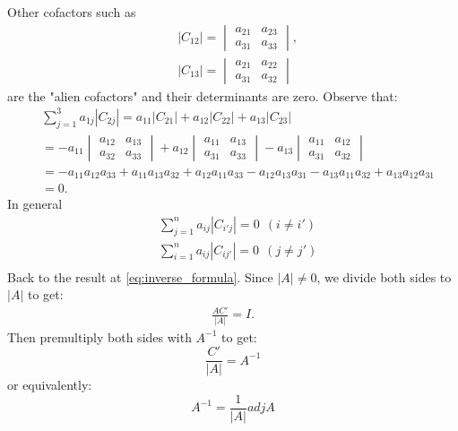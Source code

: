\documentclass[10pt,a4paper]{book}
\theoremstyle{definition}\newtheorem{definition}{Definition}
\theoremstyle{definition}\newtheorem{fact}{Fact}
\theoremstyle{definition}\newtheorem{ex}{Ex.}
\theoremstyle{definition}\newtheorem{project}{Project}
\theoremstyle{definition}\newtheorem{problem}{Problem}
\theoremstyle{definition}\newtheorem{example}{Example}
\numberwithin{theorem}{chapter}
\numberwithin{corollary}{chapter}
\numberwithin{assumption}{chapter}
\numberwithin{definition}{chapter}
\numberwithin{prop}{chapter}
\numberwithin{notation}{chapter}
\numberwithin{problem}{chapter}
\numberwithin{example}{chapter}
\numberwithin{fact}{chapter}
\numberwithin{ex}{chapter}
\begin{document}
	Other cofactors such as
	\begin{align*}
		& |C_{12}| = \begin{vmatrix} a_{21} & a_{23} \\ a_{31} & a_{33} \end{vmatrix}, \\
		& |C_{13}| = \begin{vmatrix} a_{21} & a_{22} \\ a_{31} & a_{32} \end{vmatrix}
	\end{align*}
	are the "alien cofactors" and their determinants are zero. Observe that:
	\begin{align*}
		&\sum_{j=1}^{3} a_{1j}|C_{2j}| = a_{11} |C_{21}| + a_{12} |C_{22}| + a_{13}|C_{23}| \\
		& =
		- a_{11} \begin{vmatrix} a_{12} & a_{13} \\ a_{32} & a_{33} \end{vmatrix} + a_{12} \begin{vmatrix} a_{11} & a_{13} \\ a_{31} & a_{33} \end{vmatrix} - a_{13} \begin{vmatrix} a_{11} & a_{12} \\ a_{31} & a_{32} \end{vmatrix} \\
		& = - a_{11} a_{12} a_{33} + a_{11} a_{13} a_{32} + a_{12} a_{11} a_{33} - a_{12} a_{13} a_{31} - a_{13} a_{11} a_{32} + a_{13} a_{12} a_{31} \\
		& = 0.
	\end{align*}
	In general
	\begin{align*}
		& \sum_{j=1}^{n} a_{ij}|C_{i'j}| = 0 \ \ (i \neq i') \\
		& \sum_{i=1}^{n} a_{ij}|C_{ij'}| = 0 \ \ (j \neq j') \\
	\end{align*}
	Back to the result at \ref{eq:inverse_formula}. Since $ |A| \neq 0 $, we divide both sides to $ |A| $ to get:
	\begin{align*}
		\frac{AC'}{|A|} = I. 
	\end{align*}
	Then premultiply both sides with $ A^{-1} $ to get:
	\begin{equation*}
		\frac{C'}{|A|} = A^{-1}
	\end{equation*}
	or equivalently:
	\begin{equation*}
		A^{-1} = \frac{1}{|A|} adj A
	\end{equation*}
	
\end{document}
